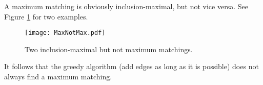 

\setcounter{section}{4}
\setcounter{subsection}{2}
\setcounter{dfn}{2}


A maximum matching is obviously inclusion-maximal, but not vice versa.
See Figure \ref{fig:MaxNotMax} for two examples.

\begin{figure}[ht]
\begin{center}
\texttt{[image: MaxNotMax.pdf]}
\end{center}
\caption{Two inclusion-maximal but not maximum matchings.}
\label{fig:MaxNotMax}
\end{figure}

It follows that the greedy algorithm (add edges as long as it is possible) does not always find a maximum matching.




